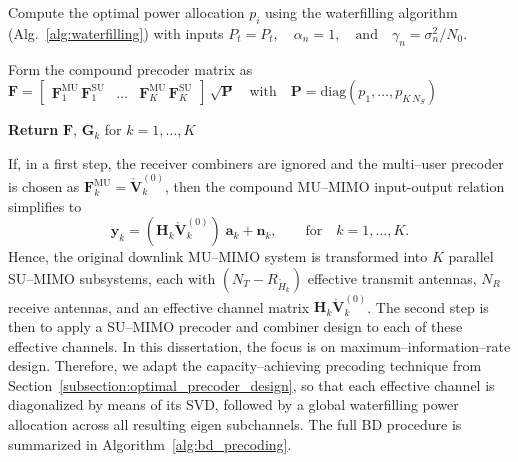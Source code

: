 \begin{algorithm}[b!]
\begin{algorithmic}[1]
    \vspace{0.4\baselineskip}
    \State Compute the optimal power allocation $p_i$ using the waterfilling algorithm (Alg.~\ref{alg:waterfilling}) with inputs
    \Statex $P_t = P_t, \quad \alpha_n = 1, \quad \text{and} \quad  \gamma_n = \sigma_n^2 / N_0.$

    \vspace{0.4\baselineskip}
    \State Form the compound precoder matrix as
    \Statex $\mathbf{F} = \begin{bmatrix} \mathbf{F}_1^{\mathrm{MU}} \, \mathbf{F}_1^{\mathrm{SU}} & \dots & \mathbf{F}_K^{\mathrm{MU}} \, \mathbf{F}_K^{\mathrm{SU}} \end{bmatrix} \, \sqrt{\mathbf{P}} \quad \text{with} \quad \mathbf{P} = \mathrm{diag}(p_1, \dots, p_{K\,N_S})$

    \medskip
    \Statex \hspace{-\algorithmicindent}\textbf{Return} \; $\mathbf{F}$, \; $\mathbf{G}_k$ for $k=1, \dots, K$

\end{algorithmic}
\end{algorithm}

If, in a first step, the receiver combiners are ignored and the multi--user precoder is chosen as $\mathbf{F}_k^{\mathrm{MU}} = \mathring{\mathbf{V}}_{k}^{(0)}$, then the compound \ac{MU}--\ac{MIMO} input-output relation simplifies to
\begin{equation}
\label{eq:bd_io_after_first_step}
    \mathbf{y}_k = (\mathbf{H}_k \mathring{\mathbf{V}}_{k}^{(0)}) \; \mathbf{a}_k + \mathbf{n}_k, \qquad \text{for} \quad k = 1, \dots, K.
\end{equation}
Hence, the original downlink \ac{MU}--\ac{MIMO} system is transformed into $K$ parallel \ac{SU}--\ac{MIMO} subsystems, each with $(N_T - R_{\mathring{H}_k})$ effective transmit antennas, $N_R$ receive antennas, and an effective channel matrix $\mathbf{H}_k \mathring{\mathbf{V}}_{k}^{(0)}$.
The second step is then to apply a \ac{SU}--\ac{MIMO} precoder and combiner design to each of these effective channels.
In this dissertation, the focus is on maximum--information--rate design. Therefore, we adapt the capacity--achieving precoding technique from Section~\ref{subsection:optimal_precoder_design}, so that each effective channel is diagonalized by means of its \ac{SVD}, followed by a global waterfilling power allocation across all resulting eigen subchannels.
The full \ac{BD} procedure is summarized in Algorithm~\ref{alg:bd_precoding}.


